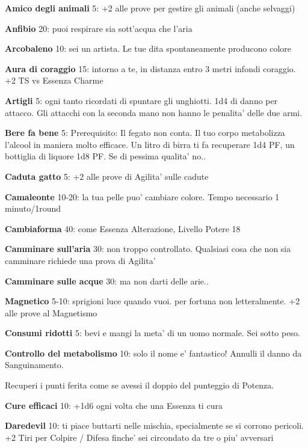 \documentclass[a4paper,11pt,twoside,openany]{dndbook}
\begin{document}
\textbf{Amico degli animali} 5: +2 alle prove per gestire gli animali (anche selvaggi)

\textbf{Anfibio} 20: puoi respirare sia sott'acqua che l'aria

\textbf{Arcobaleno} 10: sei un artista. Le tue dita spontaneamente
producono colore

\textbf{Aura di coraggio} 15: intorno a te, in distanza entro 3 metri infondi coraggio. +2 TS vs Essenza Charme

\textbf{Artigli} 5: ogni tanto ricordati di spuntare gli unghiotti. 1d4 di danno per attacco. Gli attacchi con la seconda mano non hanno le penalita' delle due armi.

\textbf{Bere fa bene} 5: Prerequisito: Il fegato non conta. Il tuo corpo metabolizza l'alcool in maniera molto efficace. Un litro di birra ti fa recuperare 1d4 PF, un bottiglia di liquore 1d8 PF. Se di pessima qualita' no.. 

\textbf{Caduta gatto} 5: +2 alle prove di Agilita' sulle cadute

\textbf{Camaleonte} 10-20: la tua pelle puo' cambiare colore. Tempo necessario 1 minuto/1round

\textbf{Cambiaforma} 40: come Essenza Alterazione, Livello Potere 18

\textbf{Camminare sull'aria} 30: non troppo controllato. Qualsiasi cosa che non sia camminare richiede una prova di Agilita'

\textbf{Camminare sulle acque}  30: ma non darti delle arie..

\textbf{Magnetico} 5-10: sprigioni luce quando vuoi. per fortuna non letteralmente. +2 alle prove al Magnetismo

\textbf{Consumi ridotti} 5: bevi e mangi la meta' di un uomo normale. Sei sotto peso.

\textbf{Controllo del metabolismo}  10: solo il nome e' fantastico! Annulli il danno da Sanguinamento.

Recuperi i punti ferita come se avessi il doppio del punteggio di Potenza.

\textbf{Cure efficaci} 10: +1d6 ogni volta che una Essenza
ti cura

\textbf{Daredevil} 10: ti piace buttarti nelle mischia, specialmente se si corrono pericoli. +2 Tiri per Colpire / Difesa finche' sei circondato da tre o piu' avversari
\end{document}
